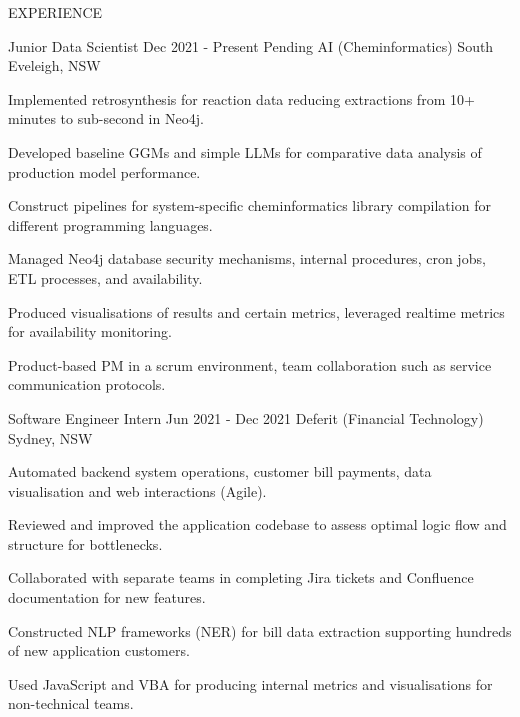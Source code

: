 
\begin{ResumeSection}{EXPERIENCE}

    \begin{DatedField}
        {Junior Data Scientist}
        {Dec 2021 - Present}
        {Pending AI (Cheminformatics)}
        {South Eveleigh, NSW}
        \item Implemented retrosynthesis for reaction data reducing extractions from 10+ minutes to sub-second in Neo4j.
        \item Developed baseline GGMs and simple LLMs for comparative data analysis of production model performance.
        \item Construct pipelines for system-specific cheminformatics library compilation for different programming languages.
        \item Managed Neo4j database security mechanisms, internal procedures, cron jobs, ETL processes, and availability.
        \item Produced visualisations of results and certain metrics, leveraged realtime metrics for availability monitoring.
        \item Product-based PM in a scrum environment, team collaboration such as service communication protocols.
    \end{DatedField}
    
    \begin{DatedField}
        {Software Engineer Intern}
        {Jun 2021 - Dec 2021}
        {Deferit (Financial Technology)}
        {Sydney, NSW}
        \item Automated backend system operations, customer bill payments, data visualisation and web interactions (Agile).
        \item Reviewed and improved the application codebase to assess optimal logic flow and structure for bottlenecks.
        \item Collaborated with separate teams in completing Jira tickets and Confluence documentation for new features.
        \item Constructed NLP frameworks (NER) for bill data extraction supporting hundreds of new application customers.
        \item Used JavaScript and VBA for producing internal metrics and visualisations for non-technical teams.
    \end{DatedField}
    

\end{ResumeSection}
